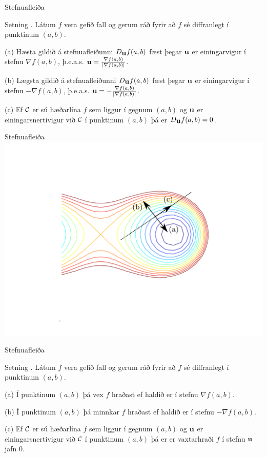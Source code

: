 \begin{frame}{Stefnuafleiða} 

\begin {block}{Setning \kaflanr.}
 Látum $f$ vera gefið fall og gerum ráð fyrir að
$f$ sé diffranlegt í punktinum $(a,b)$.

\medskip
(a)  Hæsta gildið á stefnuafleiðunni $D_{\mbox{${\bf u}$}}f(a,b)$ fæst þegar $\mbox{${\bf u}$}$
er einingarvigur í stefnu $\nabla f(a,b)$, þ.e.a.s. $\mbox{${\bf u}$}=\frac{\nabla
  f(a,b)}{|\nabla f(a,b)|}$.  

\medskip
(b)  Lægsta gildið á stefnuafleiðunni $D_{\mbox{${\bf u}$}}f(a,b)$ fæst þegar $\mbox{${\bf u}$}$
er einingarvigur í stefnu $-\nabla f(a,b)$, þ.e.a.s. $\mbox{${\bf u}$}=-\frac{\nabla
  f(a,b)}{|\nabla f(a,b)|}$. 

\medskip
(c)  Ef $\cal C$ er sú hæðarlína $f$ sem liggur í gegnum $(a,b)$ og
$\mbox{${\bf u}$}$ er einingarsnertivigur við $\cal C$ í punktinum $(a,b)$ þá er
$D_{\mbox{${\bf u}$}}f(a,b)=0$.  

\end{block}

\end{frame}


\begin{frame}{Stefnuafleiða}
   \centering
            \includegraphics[width=1\linewidth]{contours.pdf}
\end{frame}


\begin{frame}{Stefnuafleiða} 

\begin {block}{Setning \kaflanr.}
Látum $f$ vera gefið fall og gerum ráð fyrir að
$f$ sé diffranlegt í punktinum $(a,b)$.  

\medskip
(a) Í punktinum $(a,b)$ þá vex $f$ hraðast ef haldið er í stefnu
$\nabla f(a,b)$.  

\medskip
(b) Í punktinum $(a,b)$ þá minnkar $f$ hraðast ef haldið er í stefnu
$-\nabla f(a,b)$.  

\medskip
(c)  Ef $\cal C$ er sú hæðarlína $f$ sem liggur í gegnum $(a,b)$ og
$\mbox{${\bf u}$}$ er einingarsnertivigur við $\cal C$ í punktinum $(a,b)$ þá er
er vaxtarhraði $f$ í stefnu $\mbox{${\bf u}$}$ jafn 0. 
\end{block}

\end{frame}

